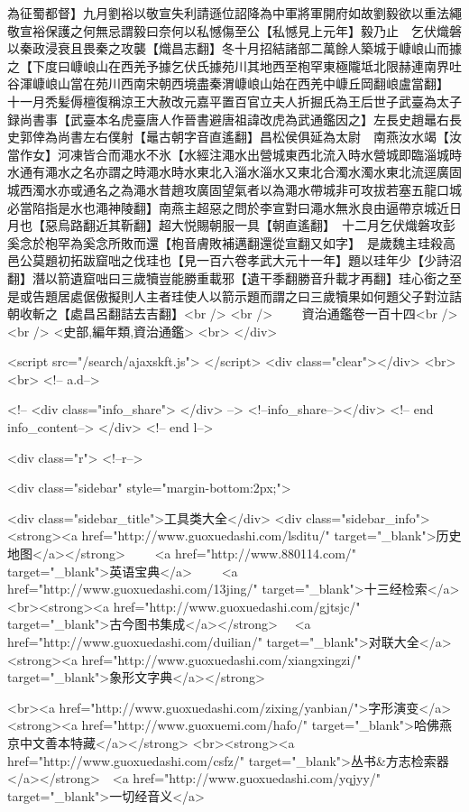 為征蜀都督】九月劉裕以敬宣失利請遜位詔降為中軍將軍開府如故劉毅欲以重法繩敬宣裕保護之何無忌謂毅曰奈何以私憾傷至公【私憾見上元年】毅乃止　乞伏熾磐以秦政浸衰且畏秦之攻襲【熾昌志翻】冬十月招結諸部二萬餘人築城于嵻㟍山而據之【下度曰嵻㟍山在西羌予據乞伏氏據苑川其地西至枹罕東極隴坻北限赫連南界吐谷渾嵻㟍山當在苑川西南宋朝西境盡秦渭嵻㟍山始在西羌中嵻丘岡翻㟍盧當翻】　十一月秃髪傉檀復稱涼王大赦改元嘉平置百官立夫人折掘氏為王后世子武臺為太子録尚書事【武臺本名虎臺唐人作晉書避唐祖諱改虎為武通鑑因之】左長史趙鼂右長史郭倖為尚書左右僕射【鼂古朝字音直遙翻】昌松侯俱延為太尉　南燕汝水竭【汝當作女】河凍皆合而澠水不氷【水經注澠水出營城東西北流入時水營城即臨淄城時水通有澠水之名亦謂之時澠水時水東北入淄水淄水又東北合濁水濁水東北流逕廣固城西濁水亦或通名之為澠水昔趙攻廣固望氣者以為澠水帶城非可攻拔若塞五龍口城必當陷指是水也澠神陵翻】南燕主超惡之問於李宣對曰澠水無氷良由逼帶京城近日月也【惡烏路翻近其靳翻】超大悦賜朝服一具【朝直遙翻】　十二月乞伏熾磐攻彭奚念於枹罕為奚念所敗而還【枹音膚敗補邁翻還從宣翻又如字】　是歲魏主珪殺高邑公莫題初拓跋窟咄之伐珪也【見一百六卷孝武大元十一年】題以珪年少【少詩沼翻】潛以箭遺窟咄曰三歲犢豈能勝重載邪【遺干季翻勝音升載才再翻】珪心銜之至是或告題居處倨傲擬則人主者珪使人以箭示題而謂之曰三歲犢果如何題父子對泣詰朝收斬之【處昌呂翻詰去吉翻】<br />
<br />
　　資治通鑑卷一百十四<br />
<br />
<史部,編年類,資治通鑑>  <br>
   </div> 

<script src="/search/ajaxskft.js"> </script>
 <div class="clear"></div>
<br>
<br>
 <!-- a.d-->

 <!--
<div class="info_share">
</div> 
-->
 <!--info_share--></div>   <!-- end info_content-->
  </div> <!-- end l-->

<div class="r">   <!--r-->



<div class="sidebar"  style="margin-bottom:2px;">

 
<div class="sidebar_title">工具类大全</div>
<div class="sidebar_info">
<strong><a href="http://www.guoxuedashi.com/lsditu/" target="_blank">历史地图</a></strong>　　
<a href="http://www.880114.com/" target="_blank">英语宝典</a>　　
<a href="http://www.guoxuedashi.com/13jing/" target="_blank">十三经检索</a>　
<br><strong><a href="http://www.guoxuedashi.com/gjtsjc/" target="_blank">古今图书集成</a></strong>　
<a href="http://www.guoxuedashi.com/duilian/" target="_blank">对联大全</a>　<strong><a href="http://www.guoxuedashi.com/xiangxingzi/" target="_blank">象形文字典</a></strong>　

<br><a href="http://www.guoxuedashi.com/zixing/yanbian/">字形演变</a>　　<strong><a href="http://www.guoxuemi.com/hafo/" target="_blank">哈佛燕京中文善本特藏</a></strong>
<br><strong><a href="http://www.guoxuedashi.com/csfz/" target="_blank">丛书&方志检索器</a></strong>　<a href="http://www.guoxuedashi.com/yqjyy/" target="_blank">一切经音义</a>　　

